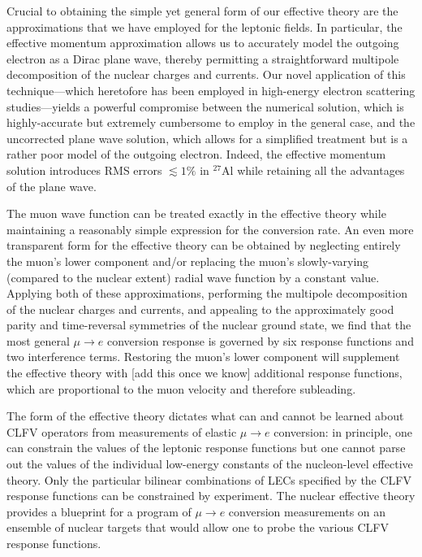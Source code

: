\documentclass{book}[letterpaper,12pt]
\begin{document}
Crucial to obtaining the simple yet general form of our effective theory are the approximations that we have employed for the leptonic fields. In particular, the effective momentum approximation allows us to accurately model the outgoing electron as a Dirac plane wave, thereby permitting a straightforward multipole decomposition of the nuclear charges and currents. Our novel application of this technique---which heretofore has been employed in high-energy electron scattering studies---yields a powerful compromise between the numerical solution, which is highly-accurate but extremely cumbersome to employ in the general case, and the uncorrected plane wave solution, which allows for a simplified treatment but is a rather poor model of the outgoing electron. Indeed, the effective momentum solution introduces RMS errors $\lesssim 1\%$ in $^{27}$Al while retaining all the advantages of the plane wave.

The muon wave function can be treated exactly in the effective theory while maintaining a reasonably simple expression for the conversion rate. An even more transparent form for the effective theory can be obtained by neglecting entirely the muon's lower component and/or replacing the muon's slowly-varying (compared to the nuclear extent) radial wave function by a constant value. Applying both of these approximations, performing the multipole decomposition of the nuclear charges and currents, and appealing to the approximately good parity and time-reversal symmetries of the nuclear ground state, we find that the most general $\mu\rightarrow e$ conversion response is governed by six response functions and two interference terms. Restoring the muon's lower component will supplement the effective theory with [add this once we know] additional response functions, which are proportional to the muon velocity and therefore subleading.

The form of the effective theory dictates what can and cannot be learned about CLFV operators from measurements of elastic $\mu\rightarrow e$ conversion: in principle, one can constrain the values of the leptonic response functions but one cannot parse out the values of the individual low-energy constants of the nucleon-level effective theory. Only the particular bilinear combinations of LECs specified by the CLFV response functions can be constrained by experiment. The nuclear effective theory provides a blueprint for a program of $\mu\rightarrow e$ conversion measurements on an ensemble of nuclear targets that would allow one to probe the various CLFV response functions.
\end{document}
